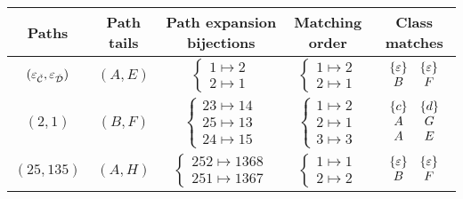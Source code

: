 \begin{tabular}{c|c|c|c|c}
Paths & Path tails & Path expansion bijections & Matching order & Class matches \\
\hline
$(\varepsilon_{\check{\mathcal{C}}},\varepsilon_{\check{\mathcal{D}}})$ & $(A,E)$ & $\begin{cases} 1 \mapsto 2 \\ 2 \mapsto 1\end{cases}$ & $\begin{cases}1 \mapsto 2\\2 \mapsto 1\end{cases}$ & 
$\begin{array}{cc}
    \left\{\varepsilon\right\} & \left\{\varepsilon\right\} \\
    B & F
\end{array}$\\
\hline
$(2,1)$ & $(B,F)$ & $\begin{cases} 23 \mapsto 14 \\ 25 \mapsto 13\\24 \mapsto 15\end{cases}$ & $\begin{cases}1 \mapsto 2\\2 \mapsto 1\\3\mapsto 3\end{cases}$ & $\begin{array}{cc} \left\{c\right\} & \left\{d\right\} \\ A & G \\ A & E\end{array}$\\
\hline
$(25,135)$ & $(A,H)$ & $\begin{cases} 252 \mapsto 1368 \\ 251 \mapsto 1367\end{cases}$ & $\begin{cases}1 \mapsto 1\\2 \mapsto 2\end{cases}$ & $\begin{array}{cc} \left\{\varepsilon\right\} & \left\{\varepsilon\right\}\\ B & F \end{array}$\\
\end{tabular}